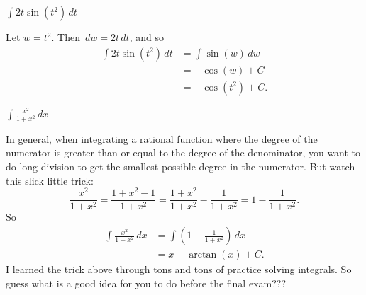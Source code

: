 \documentclass[nooutcomes]{ximera}
\renewcommand{\d}{\,d}
\renewenvironment{freeResponse}{
\ifhandout\setbox0\vbox\bgroup\else
\begin{trivlist}\item[\hskip \labelsep\bfseries Solution:\hspace{2ex}]
\fi}
{\ifhandout\egroup\else
\end{trivlist}
\fi}
\begin{document}
	
\begin{problem}
$\int 2t \sin \left( t^2 \right) \d t$
  \begin{freeResponse}
    Let $w=t^2$.  Then $\d w = 2t \d t$, and so
    \begin{align*}
      \int 2t \sin(t^2) \d t &= \int \sin(w) \d w  \\
                             &= - \cos(w) + C  \\
                             &= - \cos(t^2) + C.
    \end{align*}
  \end{freeResponse}
\end{problem}

\begin{problem}
  $\int \frac{x^2 }{1 + x^2} \d x$
  \begin{freeResponse}
    In general, when integrating a rational function where the degree
    of the numerator is greater than or equal to the degree of the
    denominator, you want to do long division to get the smallest
    possible degree in the numerator.  But watch this slick little
    trick:
    \begin{equation*}
      \frac{x^2}{1+x^2} = \frac{1 + x^2 - 1}{1+x^2} = \frac{1+x^2}{1+x^2} - \frac{1}{1+x^2} = 1 - \frac{1}{1+x^2}.
    \end{equation*}
    So
    \begin{align*}
      \int \frac{x^2 }{1 + x^2} \d x &= \int \left( 1 - \frac{1}{1+x^2} \right) \d x  \\
                                     &= x - \arctan(x) + C.
    \end{align*}
    I learned the trick above through tons and tons of practice
    solving integrals.  So guess what is a good idea for you to do
    before the final exam???
  \end{freeResponse}

\end{problem}
\end{document}
